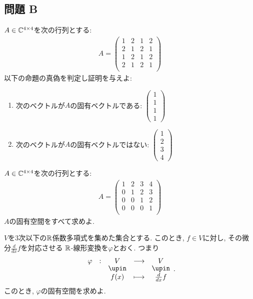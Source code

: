 \subsection{問題 B}
\begin{quiz}
  $A\in \mathbb{C}^{4\times 4}$を次の行列とする:
  \begin{align*}
    A=
    \begin{pmatrix}
      1&2&1&2\\
      2&1&2&1\\
      1&2&1&2\\
      2&1&2&1\\
    \end{pmatrix}
  \end{align*}
  以下の命題の真偽を判定し証明を与えよ:
  \begin{enumerate}
  \item 次のベクトルが$A$の固有ベクトルである:
      $\begin{pmatrix}1\\1\\1\\1\end{pmatrix}$
  \item 次のベクトルが$A$の固有ベクトルではない:
      $\begin{pmatrix}1\\2\\3\\4\end{pmatrix}$
  \end{enumerate}
\end{quiz}

\begin{quiz}
  $A\in \mathbb{C}^{4\times 4}$を次の行列とする:
  \begin{align*}
    A=
    \begin{pmatrix}
      1&2&3&4\\
      0&1&2&3\\
      0&0&1&2\\
      0&0&0&1\\
    \end{pmatrix}
  \end{align*}
  $A$の固有空間をすべて求めよ.
\end{quiz}


\begin{quiz}
  $V$を$3$次以下の$\mathbb{R}$係数多項式を集めた集合とする.
  このとき,
  $f\in V$に対し, その微分$\frac{d}{dx}f$を対応させる
  $\mathbb{R}$-線形変換を$\varphi$とおく. つまり
  \begin{align*}
    \shazo{\varphi}{V}{V}
    {f(x)}{\frac{d}{dx}f}.
  \end{align*}
  このとき,
  $\varphi$の固有空間を求めよ.
\end{quiz}

